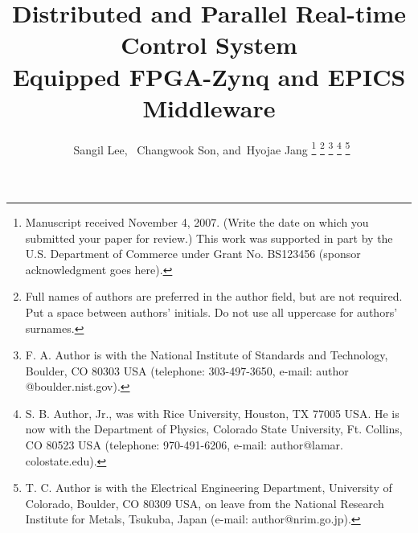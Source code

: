 \documentclass[journal]{IEEEtran}
\begin{document}
\title{Distributed and Parallel Real-time Control System \\ 
	Equipped FPGA-Zynq and EPICS Middleware}
%
%

\author{~Sangil Lee,
	~Changwook Son,
	and~Hyojae Jang%
\thanks{Manuscript received November 4, 2007. (Write the date on which you submitted your paper for review.) This work was supported in part by the U.S. Department of Commerce under Grant No. BS123456 (sponsor acknowledgment goes here).}%
\thanks{Full names of authors are preferred in the author field, but are not required. Put a space between authors' initials. Do not use all uppercase for authors' surnames.}%
\thanks{F. A. Author is with the National Institute of Standards and Technology, Boulder, CO 80303 USA (telephone: 303-497-3650, e-mail: author @boulder.nist.gov).}%
\thanks{S. B. Author, Jr., was with Rice University, Houston, TX 77005 USA. He is now with the Department of Physics, Colorado State University, Ft. Collins, CO 80523 USA (telephone: 970-491-6206, e-mail: author@lamar. colostate.edu).}%
\thanks{T. C. Author is with the Electrical Engineering Department, University of Colorado, Boulder, CO 80309 USA, on leave from the National Research Institute for Metals, Tsukuba, Japan (e-mail: author@nrim.go.jp).}%
}

\maketitle
\thispagestyle{empty}
\end{document}
